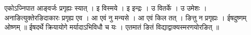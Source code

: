 एकोऽज्निपात आङ्वर्जः प्रगृह्यः स्यात् । इ विस्मये । इ इन्द्रः । उ
वितर्के । उ उमेशः । अनाङित्युक्तेरङिदाकारः प्रगृह्य एव । आ एवं नु मन्यसे
। आ एवं किल तत् । ङित्तु न प्रगृह्यः । ईषदुष्णम् ओष्णम् ॥ ईषदर्थे
क्रियायोगे मर्यादाऽभिविधौ च यः । एतमातं ङितं विद्याद्वाक्यस्मरणयोरङित् ॥
